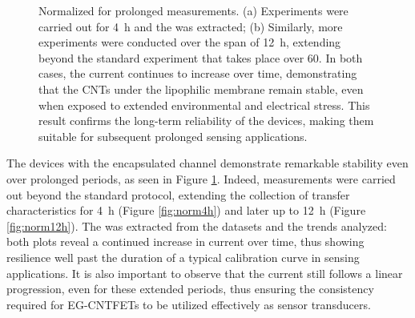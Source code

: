 \begin{figure}
    \centering
    \quad
    \caption{Normalized \ion{} for prolonged measurements. 
        (a) Experiments were carried out for \SI{4}{\hour} and the \ion{} was extracted; 
        (b) Similarly, more experiments were conducted over the span of \SI{12}{\hour}, extending beyond the standard experiment that takes place over \SI{60}{\min}. In both cases, the current continues to increase over time, demonstrating that the CNTs under the lipophilic membrane remain stable, even when exposed to extended environmental and electrical stress. This result confirms the long-term reliability of the devices, making them suitable for subsequent prolonged sensing applications.}
    \label{fig:normLong}
\end{figure}

The devices with the encapsulated channel demonstrate remarkable stability even over prolonged periods, as seen in Figure \ref{fig:normLong}. Indeed, measurements were carried out beyond the standard protocol, extending the collection of transfer characteristics for \SI{4}{\hour} (Figure \ref{fig:norm4h}) and later up to \SI{12}{\hour} (Figure \ref{fig:norm12h}). The \ion{} was extracted from the datasets and the trends analyzed: both plots reveal a continued increase in current over time, thus showing resilience well past the duration of a typical calibration curve in sensing applications. It is also important to observe that the current still follows a linear progression, even for these extended periods, thus ensuring the consistency required for EG-CNTFETs to be utilized effectively as sensor transducers.

